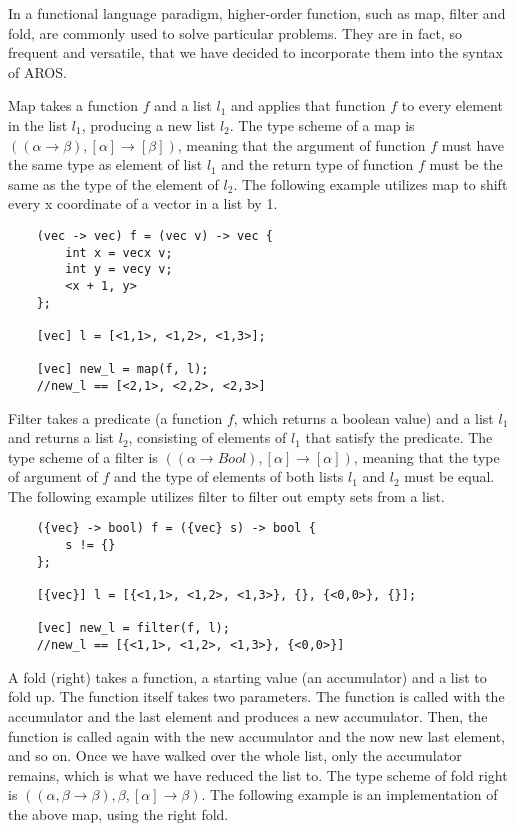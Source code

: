 \par 
In a functional language paradigm, higher-order function, such as map, filter and fold, are commonly used to solve particular problems. They are in fact, so frequent and versatile, that we have decided to incorporate them into the syntax of AROS. 

\par 
Map takes a function $f$ and a list $l_1$ and applies that function $f$ to every element in the list $l_1$, producing a new list $l_2$. The type scheme of a map is $((\alpha \rightarrow \beta), [\alpha] \rightarrow [\beta])$, meaning that the argument of function $f$ must have the same type as element of list $l_1$ and the return type of function $f$ must be the same as the type of the element of $l_2$. The following example utilizes map to shift every x coordinate of a vector in a list by 1.

\newblock 
\begin{lstlisting}
    (vec -> vec) f = (vec v) -> vec {
        int x = vecx v;
        int y = vecy v;
        <x + 1, y>
    };
    
    [vec] l = [<1,1>, <1,2>, <1,3>];
    
    [vec] new_l = map(f, l); 
    //new_l == [<2,1>, <2,2>, <2,3>]
\end{lstlisting}

\newblock
\par 
Filter takes a predicate (a function $f$, which returns a boolean value) and a list $l_1$ and returns a list $l_2$, consisting of elements of $l_1$ that satisfy the predicate. The type scheme of a filter is $((\alpha \rightarrow Bool), [\alpha] \rightarrow [\alpha])$, meaning that the type of argument of $f$ and the type of elements of both lists $l_1$ and $l_2$ must be equal. The following example utilizes filter to filter out empty sets from a list.

\newblock 
\begin{lstlisting}
    ({vec} -> bool) f = ({vec} s) -> bool {
        s != {}
    };
    
    [{vec}] l = [{<1,1>, <1,2>, <1,3>}, {}, {<0,0>}, {}];
    
    [vec] new_l = filter(f, l); 
    //new_l == [{<1,1>, <1,2>, <1,3>}, {<0,0>}]
\end{lstlisting}

\newblock
\par
A fold (right) takes a function, a starting value (an accumulator) and a list to fold up. The function itself takes two parameters. The function is called with the accumulator and the last element and produces a new accumulator. Then, the function is called again with the new accumulator and the now new last element, and so on. Once we have walked over the whole list, only the accumulator remains, which is what we have reduced the list to. \cite[p. 61]{learn-you-a-haskell-for-great-good} The type scheme of fold right is $((\alpha, \beta \rightarrow \beta), \beta, [\alpha] \rightarrow \beta)$. The following example is an implementation of the above map, using the right fold.


